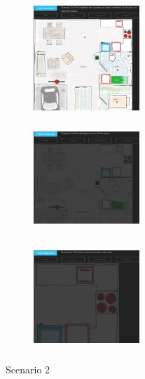 \begin{figure}[ht]
\centering
\begin{subfigure}{0.23\textwidth}
\includegraphics[width=4cm, height=4cm]{fig/scenario2a}
\caption{}
\label{fig:2a}
\end{subfigure}
\begin{subfigure}{0.23\textwidth}
\includegraphics[width=4cm, height=4cm]{fig/scenario2b}
\caption{}
\label{fig:2b}
\end{subfigure}
\begin{subfigure}{0.23\textwidth}
\includegraphics[width=4cm, height=4cm]{fig/scenario2c}
\caption{}
\label{fig:2c}
\end{subfigure}
\caption{Scenario 2}
\label{fig:scenario2}
\end{figure}

